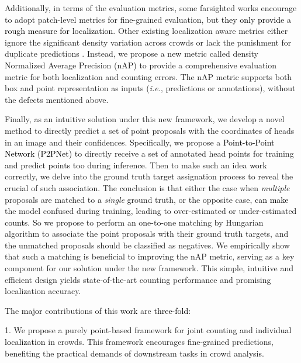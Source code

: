 \documentclass[10pt,twocolumn,letterpaper]{article}
\newcommand{\ywunew}[1]{\textcolor{black}{#1}}
\newcommand{\ywu}[1]{\textcolor{black}{#1}}
\begin{document}
Additionally, in terms of the evaluation metrics, some farsighted works \cite{guerrero2015extremely, tian2019padnet} encourage to adopt patch-level metrics for fine-grained evaluation, but \ywunew{they only provide a rough measure for localization}. Other existing localization aware metrics either ignore the significant density variation across crowds \cite{liu2019point,sam2020locate} or lack the punishment for duplicate predictions \cite{sam2020locate,wang2020nwpu}. Instead, we propose a new metric called density Normalized Average Precision (nAP) to provide a comprehensive evaluation metric for both localization and counting errors. The nAP metric supports both box and point representation as inputs (\textit{i.e.}, predictions or annotations), without the defects mentioned above.



Finally, as an intuitive solution under this new framework, we develop a novel method to directly predict a set of point proposals with the coordinates of heads in an image and their confidences. Specifically, we propose a \ywunew{Point-to-Point Network (P2PNet)} to directly receive a set of annotated head points for training and predict \ywunew{points too during inference}. Then to make such an idea \ywunew{work} correctly, we delve into the ground truth \ywunew{target} assignation process to reveal the crucial of such association. The conclusion is that either the case when \textit{multiple} proposals are matched to \ywunew{a} \textit{single} ground truth, or the opposite case, \ywunew{can make} the model confused during training, leading to over-estimated or under-estimated \ywu{counts}. So we propose to perform an one-to-one matching by Hungarian algorithm to associate the point proposals with their ground truth targets, and \ywunew{the} unmatched proposals should be classified as negatives. We empirically show that such \ywunew{a} matching is beneficial to \ywunew{improving} the nAP metric, serving as a key component for our solution under the new framework. This simple, intuitive and efficient design yields state-of-the-art counting performance and promising localization accuracy. 

The \ywunew{major} contributions of this \ywunew{work} are \ywunew{three-fold}:

1. We propose a purely point-based framework for joint counting and \ywunew{individual localization} in crowds. This framework encourages fine-grained predictions, benefiting the practical demands of downstream tasks in crowd analysis.
\end{document}
